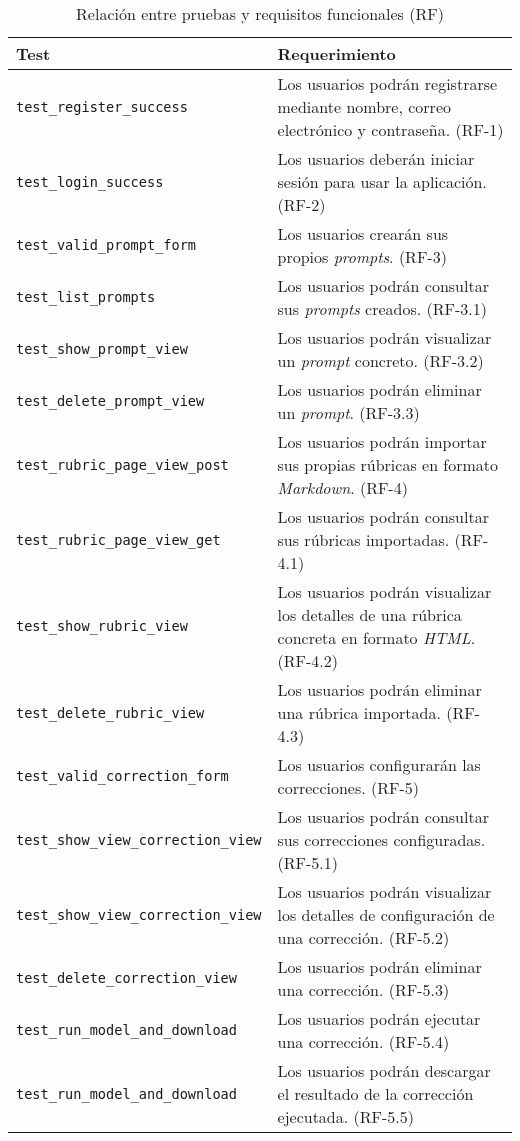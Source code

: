 \begin{table}[H]
\centering
\begin{tabularx}{\textwidth}{>{\ttfamily}lX}
\toprule
\textnormal{Test} & Requerimiento \\
\midrule
\texttt{test\_register\_success} & Los usuarios podrán registrarse mediante nombre, correo electrónico y contraseña. (RF-1) \\
\texttt{test\_login\_success} & Los usuarios deberán iniciar sesión para usar la aplicación. (RF-2) \\
\texttt{test\_valid\_prompt\_form} & Los usuarios crearán sus propios \textit{prompts}. (RF-3) \\
\texttt{test\_list\_prompts} & Los usuarios podrán consultar sus \textit{prompts} creados. (RF-3.1) \\
\texttt{test\_show\_prompt\_view} & Los usuarios podrán visualizar un \textit{prompt} concreto. (RF-3.2) \\
\texttt{test\_delete\_prompt\_view} & Los usuarios podrán eliminar un \textit{prompt}. (RF-3.3) \\
\texttt{test\_rubric\_page\_view\_post} & Los usuarios podrán importar sus propias rúbricas en formato \textit{Markdown}. (RF-4) \\
\texttt{test\_rubric\_page\_view\_get} & Los usuarios podrán consultar sus rúbricas importadas. (RF-4.1) \\
\texttt{test\_show\_rubric\_view} & Los usuarios podrán visualizar los detalles de una rúbrica concreta en formato \textit{HTML}. (RF-4.2) \\
\texttt{test\_delete\_rubric\_view} & Los usuarios podrán eliminar una rúbrica importada. (RF-4.3) \\
\texttt{test\_valid\_correction\_form} & Los usuarios configurarán las correcciones. (RF-5) \\
\texttt{test\_show\_view\_correction\_view} & Los usuarios podrán consultar sus correcciones configuradas. (RF-5.1) \\
\texttt{test\_show\_view\_correction\_view} & Los usuarios podrán visualizar los detalles de configuración de una corrección. (RF-5.2) \\
\texttt{test\_delete\_correction\_view} & Los usuarios podrán eliminar una corrección. (RF-5.3) \\
\texttt{test\_run\_model\_and\_download} & Los usuarios podrán ejecutar una corrección. (RF-5.4) \\
\texttt{test\_run\_model\_and\_download} & Los usuarios podrán descargar el resultado de la corrección ejecutada. (RF-5.5) \\
\bottomrule
\end{tabularx}
\caption{Relación entre pruebas y requisitos funcionales (RF)}
\label{requisitos-test}
\end{table}

